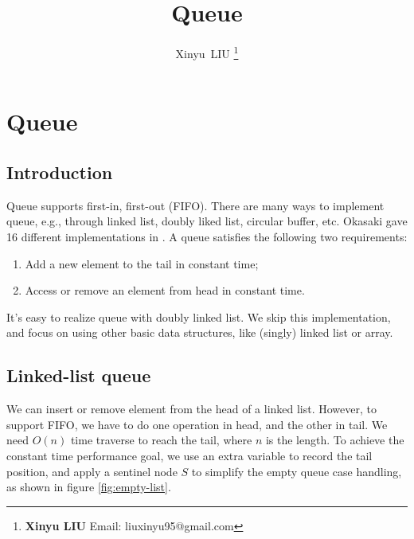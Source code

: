 \documentclass[b5paper]{article}
\begin{document}
\title{Queue}

\author{Xinyu~LIU
\thanks{{\bfseries Xinyu LIU} \newline
  Email: liuxinyu95@gmail.com \newline}
  }

\maketitle
\fi


\ifx\wholebook\relax
\chapter{Queue}
\fi

\section{Introduction}
\label{introduction}

Queue supports first-in, first-out (FIFO). There are many ways to implement queue, e.g., through linked list, doubly liked list, circular buffer, etc. Okasaki gave 16 different implementations in \cite{okasaki-book}. A queue satisfies the following two requirements:

\begin{enumerate}
\item Add a new element to the tail in constant time;
\item Access or remove an element from head in constant time.
\end{enumerate}

It's easy to realize queue with doubly linked list. We skip this implementation, and focus on using other basic data structures, like (singly) linked list or array.

\section{Linked-list queue}

We can insert or remove element from the head of a linked list. However, to support FIFO, we have to do one operation in head, and the other in tail. We need $O(n)$ time traverse to reach the tail, where $n$ is the length. To achieve the constant time performance goal, we use an extra variable to record the tail position, and apply a sentinel node $S$ to simplify the empty queue case handling, as shown in figure \cref{fig:empty-list}.
\end{document}
